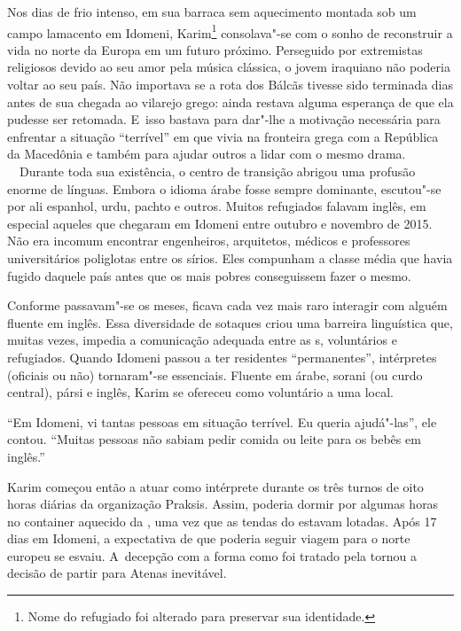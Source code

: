  

Nos dias de frio intenso, em sua barraca sem aquecimento montada sob um
campo lamacento em Idomeni, Karim\footnote{ Nome do refugiado foi alterado para preservar sua
identidade.}  consolava"-se com o
sonho de reconstruir a vida no norte da Europa em um futuro próximo.
Perseguido por extremistas religiosos devido ao seu amor pela música
clássica, o jovem iraquiano não poderia voltar ao seu país. Não
importava se a rota dos Bálcãs tivesse sido terminada dias antes de sua
chegada ao vilarejo grego: ainda restava alguma esperança de que ela
pudesse ser retomada. E~isso bastava para dar"-lhe a motivação necessária
para enfrentar a situação ``terrível'' em que vivia na fronteira grega
com a República da Macedônia e também para ajudar outros a lidar com o
mesmo drama.
\ \
Durante toda sua existência, o centro de transição abrigou uma
profusão enorme de línguas. Embora o idioma árabe fosse sempre
dominante, escutou"-se por ali espanhol, urdu, pachto e outros.
Muitos refugiados falavam inglês, em especial aqueles que chegaram em
Idomeni entre outubro e novembro de 2015. Não era incomum encontrar
 engenheiros, arquitetos, médicos e professores
universitários poliglotas entre os sírios. Eles compunham a classe média que havia
fugido daquele país antes que os mais pobres conseguissem fazer o mesmo.

Conforme passavam"-se os meses, ficava cada vez mais raro interagir com
alguém fluente em inglês. Essa diversidade de sotaques criou uma
barreira linguística que, muitas vezes, impedia a comunicação adequada entre as  s, voluntários e
refugiados. Quando Idomeni passou a ter
residentes ``permanentes'', intérpretes (oficiais ou não) tornaram"-se
essenciais. Fluente em árabe, sorani (ou curdo central), pársi e inglês,
Karim se ofereceu como voluntário a uma \versal{ONG} local.

``Em Idomeni, vi tantas pessoas em situação terrível. Eu queria
ajudá"-las'', ele contou. ``Muitas pessoas não sabiam pedir comida ou
leite para os bebês em inglês.''

Karim começou então a atuar como intérprete durante os três turnos de
oito horas diárias da organização Praksis. Assim, poderia dormir por
algumas horas no container aquecido da \versal{ONG}, uma vez que as tendas do 
estavam lotadas. Após 17 dias em Idomeni, a expectativa de que poderia
seguir viagem para o norte europeu se esvaiu. A~decepção com a forma
como foi tratado pela \versal{ONG} tornou a decisão de partir para Atenas
inevitável.

